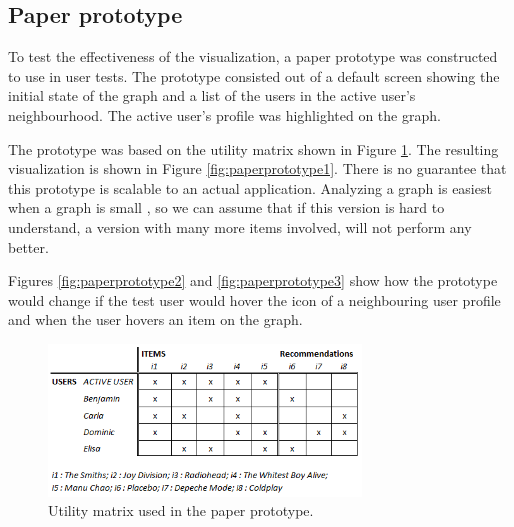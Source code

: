 \documentclass[a4paper,10pt,twocolumn]{article}
\begin{document}
\subsection*{Paper prototype}

To test the effectiveness of the visualization, a paper prototype was constructed to use in user tests. The prototype consisted out of a default screen showing the initial state of the graph and a list of the users in the active user's neighbourhood. The active user's profile was highlighted on the graph.

The prototype was based on the utility matrix shown in Figure \ref{fig:matrixprototype}. The resulting visualization is shown in Figure \ref{fig:paperprototype1}. There is no guarantee that this prototype is scalable to an actual application. Analyzing a graph is easiest when a graph is small \cite{herman2000}, so we can assume that if this version is hard to understand, a version with many more items involved, will not perform any better.

Figures \ref{fig:paperprototype2} and \ref{fig:paperprototype3} show how the prototype would change if the test user would hover the icon of a neighbouring user profile and when the user hovers an item on the graph.

\begin{figure}[!ht]
  \begin{center}
  	
    \includegraphics[width=8.3cm]{data/utility-matrix-prototype}
  \end{center}
  \caption{Utility matrix used in the paper prototype.}
  \label{fig:matrixprototype}
\end{figure}
\end{document}
